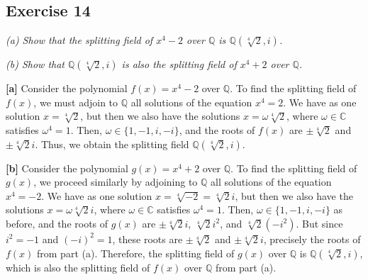 \subsection*{Exercise 14}
\textit{(a) Show that the splitting field of $x^4 - 2$ over $\mathbb{Q}$ is $\mathbb{Q}(\sqrt[4]{2},i)$.}

\textit{(b) Show that $\mathbb{Q}(\sqrt[4]{2},i)$ is also the splitting field of $x^4 + 2$ over $\mathbb{Q}$.}

\vspace{5 mm}
\textbf{[a]} Consider the polynomial $f(x) = x^4 - 2$ over $\mathbb{Q}$. To find the splitting field of $f(x)$, we must adjoin to $\mathbb{Q}$ all solutions of the equation $x^4 = 2$. We have as one solution $x = \sqrt[4]{2}$, but then we also have the solutions $x = \omega\sqrt[4]{2}$, where $\omega \in \mathbb{C}$ satisfies $\omega^4 = 1$. Then, $\omega \in \{1,-1,i,-i\}$, and the roots of $f(x)$ are $\pm\sqrt[4]{2}$ and $\pm\sqrt[4]{2}i$. Thus, we obtain the splitting field $\mathbb{Q}(\sqrt[4]{2},i)$.

\vspace{5 mm}
\textbf{[b]} Consider the polynomial $g(x) = x^4 + 2$ over $\mathbb{Q}$. To find the splitting field of $g(x)$, we proceed similarly by adjoining to $\mathbb{Q}$ all solutions of the equation $x^4 = -2$. We have as one solution $x = \sqrt[4]{-2} = \sqrt[4]{2}i$, but then we also have the solutions $x = \omega\sqrt[4]{2}i$, where $\omega \in \mathbb{C}$ satisfies $\omega^4 = 1$. Then, $\omega \in \{1,-1,i,-i\}$ as before, and the roots of $g(x)$ are $\pm\sqrt[4]{2}i$, $\sqrt[4]{2}i^2$, and $\sqrt[4]{2}(-i^2)$. But since $i^2 = -1$ and $(-i)^2 = 1$, these roots are $\pm\sqrt[4]{2}$ and $\pm\sqrt[4]{2}i$, precisely the roots of $f(x)$ from part (a). Therefore, the splitting field of $g(x)$ over $\mathbb{Q}$ is $\mathbb{Q}(\sqrt[4]{2},i)$, which is also the splitting field of $f(x)$ over $\mathbb{Q}$ from part (a).